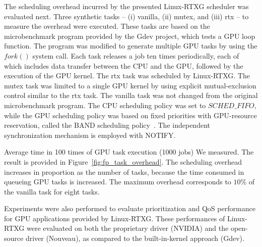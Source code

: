 The scheduling overhead incurred by the presented Linux-RTXG scheduler was evaluated next.
Three synthetic tasks -- (i) vanilla, (ii) mutex, and (iii) rtx -- to measure the overhead were executed.
These tasks are based on the microbenchmark program provided by the Gdev project, which tests a GPU loop function.
The program was modified to generate multiple GPU tasks by using the $fork()$ system call.
Each task releases a job ten times periodically, each of which includes data transfer between the CPU and the GPU, followed by the execution of the GPU kernel.
The rtx task was scheduled by Linux-RTXG.
The mutex task was limited to a single GPU kernel by using explicit mutual-exclusion control similar to the rtx task.
The vanilla task was not changed from the original microbenchmark program.
The CPU scheduling policy was set to $SCHED\_FIFO$, while the GPU scheduling policy was based on fixed priorities with GPU-resource reservation, called the BAND scheduling policy~\cite{kato:gdev}.
The independent synchronization mechanism is employed with NOTIFY.

Average time in 100 times of GPU task execution (1000 jobs) We measured.
The result is provided in Figure~\ref{fig:fp_task_overhead}.
The scheduling overhead increases in proportion as the number of tasks, because the time consumed in queueing GPU tasks is increased.
The maximum overhead corresponds to $10\%$ of the vanilla task for eight tasks.

Experiments were also performed to evaluate prioritization and QoS performance for GPU applications provided by Linux-RTXG.
These performances of Linux-RTXG were evaluated on both the proprietary driver (NVIDIA) and the open-source driver (Nouveau), as compared to the built-in-kernel approach (Gdev).


